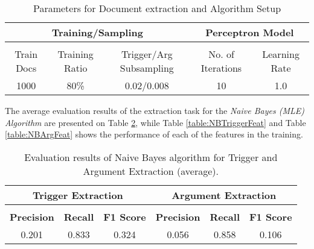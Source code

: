 \documentclass{article} %
\begin{document}
\begin{table}[!htbp]
\caption{Parameters for Document extraction and Algorithm Setup}
\label{table:Parameters}
\begin{center}
\begin{tabular}{c c c c c}
\multicolumn{3}{c}{\bf Training/Sampling}  &\multicolumn{2}{c}{\bf Perceptron Model}
\\ \hline \\
Train Docs & Training Ratio & Trigger/Arg Subsampling & No. of Iterations & Learning Rate\\
1000 & 80\% & 0.02/0.008 & 10 & 1.0\\
\end{tabular}
\end{center}
\end{table}

The average evaluation results of the extraction task for the \textit{Naive Bayes (MLE) Algorithm} are presented on Table \ref{table:EvalNB}, while Table \ref{table:NBTriggerFeat} and Table \ref{table:NBArgFeat} shows the performance of each of the features in the training.

\begin{table}[!hbp]
\caption{Evaluation results of Naive Bayes algorithm for Trigger and Argument Extraction (average).}
\begin{center}
\label{table:EvalNB}

\begin{tabular}{c c c c c c}
\multicolumn{3}{c}{\bf Trigger Extraction}  &\multicolumn{3}{c}{\bf Argument Extraction}
\\ \hline \\
\textbf{Precision} & \textbf{Recall} & \textbf{F1 Score} & \textbf{Precision} & \textbf{Recall} & \textbf{F1 Score}\\
0.201 & 0.833 & 0.324 & 0.056 & 0.858 & 0.106\\
\end{tabular}
\end{center}
\end{table}

\end{document}
